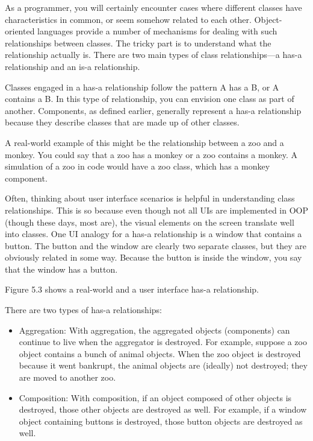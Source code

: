 
As a programmer, you will certainly encounter cases where different classes have characteristics in common, or seem somehow related to each other. Object-oriented languages provide a number of mechanisms for dealing with such relationships between classes. The tricky part is to understand what the relationship actually is. There are two main types of class relationships—a has-a relationship and an is-a relationship.


Classes engaged in a has-a relationship follow the pattern A has a B, or A contains a B. In this type of relationship, you can envision one class as part of another. Components, as defined earlier, generally represent a has-a relationship because they describe classes that are made up of other classes.

A real-world example of this might be the relationship between a zoo and a monkey. You could say that a zoo has a monkey or a zoo contains a monkey. A simulation of a zoo in code would have a zoo class, which has a monkey component.

Often, thinking about user interface scenarios is helpful in understanding class relationships. This is so because even though not all UIs are implemented in OOP (though these days, most are), the visual elements on the screen translate well into classes. One UI analogy for a has-a relationship is a window that contains a button. The button and the window are clearly two separate classes, but they are obviously related in some way. Because the button is inside the window, you say that the window has a button.

Figure 5.3 shows a real-world and a user interface has-a relationship.


There are two types of has-a relationships:

\begin{itemize}
\item
Aggregation: With aggregation, the aggregated objects (components) can continue to live when the aggregator is destroyed. For example, suppose a zoo object contains a bunch of animal objects. When the zoo object is destroyed because it went bankrupt, the animal objects are (ideally) not destroyed; they are moved to another zoo.

\item
Composition: With composition, if an object composed of other objects is destroyed, those other objects are destroyed as well. For example, if a window object containing buttons is destroyed, those button objects are destroyed as well.
\end{itemize}

